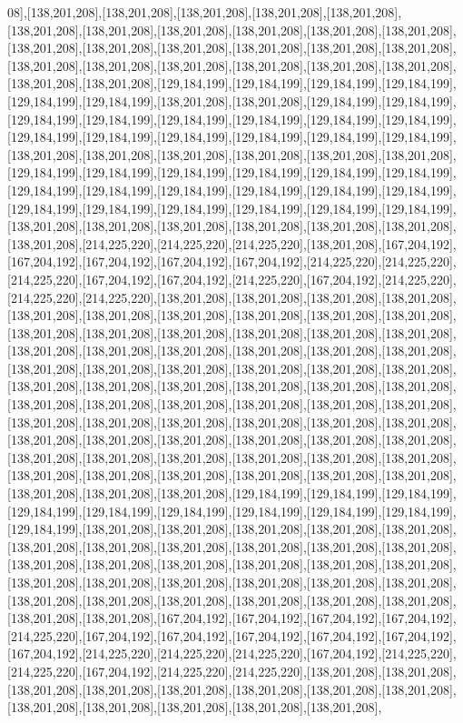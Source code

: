 08],[138,201,208],[138,201,208],[138,201,208],[138,201,208],[138,201,208],[138,201,208],[138,201,208],[138,201,208],[138,201,208],[138,201,208],[138,201,208],[138,201,208],[138,201,208],[138,201,208],[138,201,208],[138,201,208],[138,201,208],[138,201,208],[138,201,208],[138,201,208],[138,201,208],[138,201,208],[138,201,208],[138,201,208],[138,201,208],[129,184,199],[129,184,199],[129,184,199],[129,184,199],[129,184,199],[129,184,199],[138,201,208],[138,201,208],[129,184,199],[129,184,199],[129,184,199],[129,184,199],[129,184,199],[129,184,199],[129,184,199],[129,184,199],[129,184,199],[129,184,199],[129,184,199],[129,184,199],[129,184,199],[129,184,199],[138,201,208],[138,201,208],[138,201,208],[138,201,208],[138,201,208],[138,201,208],[129,184,199],[129,184,199],[129,184,199],[129,184,199],[129,184,199],[129,184,199],[129,184,199],[129,184,199],[129,184,199],[129,184,199],[129,184,199],[129,184,199],[129,184,199],[129,184,199],[129,184,199],[129,184,199],[129,184,199],[129,184,199],[138,201,208],[138,201,208],[138,201,208],[138,201,208],[138,201,208],[138,201,208],[138,201,208],[214,225,220],[214,225,220],[214,225,220],[138,201,208],[167,204,192],[167,204,192],[167,204,192],[167,204,192],[167,204,192],[214,225,220],[214,225,220],[214,225,220],[167,204,192],[167,204,192],[214,225,220],[167,204,192],[214,225,220],[214,225,220],[214,225,220],[138,201,208],[138,201,208],[138,201,208],[138,201,208],[138,201,208],[138,201,208],[138,201,208],[138,201,208],[138,201,208],[138,201,208],[138,201,208],[138,201,208],[138,201,208],[138,201,208],[138,201,208],[138,201,208],[138,201,208],[138,201,208],[138,201,208],[138,201,208],[138,201,208],[138,201,208],[138,201,208],[138,201,208],[138,201,208],[138,201,208],[138,201,208],[138,201,208],[138,201,208],[138,201,208],[138,201,208],[138,201,208],[138,201,208],[138,201,208],[138,201,208],[138,201,208],[138,201,208],[138,201,208],[138,201,208],[138,201,208],[138,201,208],[138,201,208],[138,201,208],[138,201,208],[138,201,208],[138,201,208],[138,201,208],[138,201,208],[138,201,208],[138,201,208],[138,201,208],[138,201,208],[138,201,208],[138,201,208],[138,201,208],[138,201,208],[138,201,208],[138,201,208],[138,201,208],[138,201,208],[138,201,208],[138,201,208],[138,201,208],[138,201,208],[138,201,208],[138,201,208],[138,201,208],[129,184,199],[129,184,199],[129,184,199],[129,184,199],[129,184,199],[129,184,199],[129,184,199],[129,184,199],[129,184,199],[129,184,199],[138,201,208],[138,201,208],[138,201,208],[138,201,208],[138,201,208],[138,201,208],[138,201,208],[138,201,208],[138,201,208],[138,201,208],[138,201,208],[138,201,208],[138,201,208],[138,201,208],[138,201,208],[138,201,208],[138,201,208],[138,201,208],[138,201,208],[138,201,208],[138,201,208],[138,201,208],[138,201,208],[138,201,208],[138,201,208],[138,201,208],[138,201,208],[138,201,208],[138,201,208],[138,201,208],[138,201,208],[167,204,192],[167,204,192],[167,204,192],[167,204,192],[214,225,220],[167,204,192],[167,204,192],[167,204,192],[167,204,192],[167,204,192],[167,204,192],[214,225,220],[214,225,220],[214,225,220],[167,204,192],[214,225,220],[214,225,220],[167,204,192],[214,225,220],[214,225,220],[138,201,208],[138,201,208],[138,201,208],[138,201,208],[138,201,208],[138,201,208],[138,201,208],[138,201,208],[138,201,208],[138,201,208],[138,201,208],[138,201,208],[138,201,208],